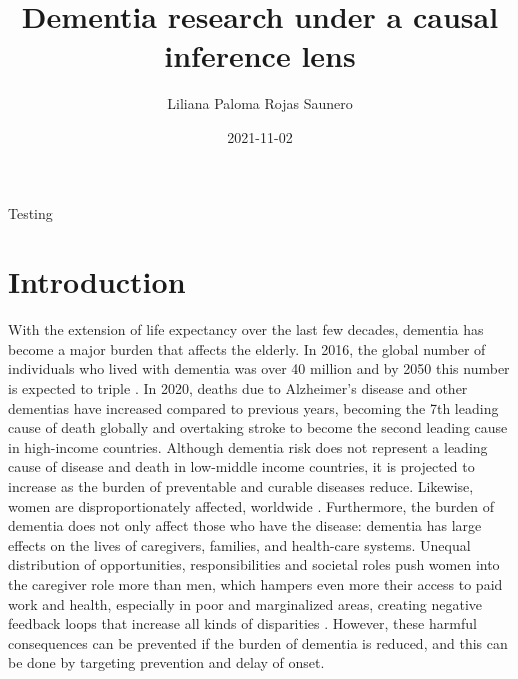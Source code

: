 \documentclass[
]{book}
\title{Dementia research under a causal inference lens}
\author{Liliana Paloma Rojas Saunero}
\date{2021-11-02}
\begin{document}
\maketitle

{
\setcounter{tocdepth}{1}
\tableofcontents
}
Testing

\hypertarget{intro}{%
\chapter{Introduction}\label{intro}}

With the extension of life expectancy over the last few decades, dementia has become a major burden that affects the elderly. In 2016, the global number of individuals who lived with dementia was over 40 million \autocite{gbd2016} and by 2050 this number is expected to triple \autocite{worldreport2018}. In 2020, deaths due to Alzheimer's disease and other dementias have increased compared to previous years, becoming the 7th leading cause of death globally and overtaking stroke to become the second leading cause in high-income countries. Although dementia risk does not represent a leading cause of disease and death in low-middle income countries, it is projected to increase as the burden of preventable and curable diseases reduce\autocite{who2020}. Likewise, women are disproportionately affected, worldwide \autocite{women2015}. Furthermore, the burden of dementia does not only affect those who have the disease: dementia has large effects on the lives of caregivers, families, and health-care systems. Unequal distribution of opportunities, responsibilities and societal roles push women into the caregiver role more than men, which hampers even more their access to paid work and health, especially in poor and marginalized areas, creating negative feedback loops that increase all kinds of disparities \autocite{swinkels2019,brodaty2009,etters2008}. However, these harmful consequences can be prevented if the burden of dementia is reduced, and this can be done by targeting prevention and delay of onset\autocite{carrillo2013}.
\end{document}
